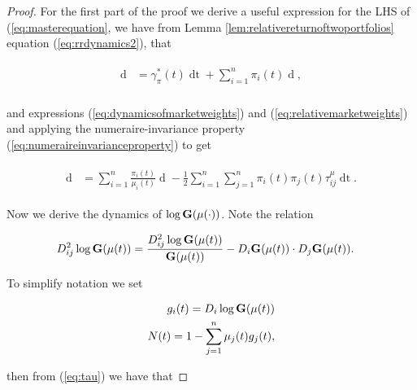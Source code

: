 \documentclass[british]{amsart} \usepackage{lmodern}
\numberwithin{equation}{section} \numberwithin{figure}{section}
\theoremstyle{plain} \newtheorem{thm}{\protect\theoremname}[section]
\theoremstyle{definition} \newtheorem{defn}[thm]{\protect\definitionname}
\theoremstyle{plain} \newtheorem{assumption}[thm]{\protect\assumptionname}
\theoremstyle{plain} \newtheorem{lem}[thm]{\protect\lemmaname}
\theoremstyle{plain} \newtheorem{prop}[thm]{\protect\propositionname}
\theoremstyle{remark} \newtheorem{rem}[thm]{\protect\remarkname}
\theoremstyle{plain} \newtheorem{cor}[thm]{\protect\corollaryname}
\renewcommand{\d}[1]{\mathop{\mathrm{d}{#1}}}
\begin{document}
\begin{proof}

For the first part of the proof we derive a useful expression for the LHS of
(\ref{eq:masterequation}, we have from Lemma
\ref{lem:relativereturnoftwoportfolios} equation (\ref{eq:rrdynamics2}), that

  \begin{gather} 
    \begin{split} 
      \d{ \log{ \left( \frac{V^{\pi}(t) }{ V^{\mu}(t) } \right) } } 
        &= \gamma_{\pi}^{*}(t)\d{t} + 
            \sum_{i=1}^{n} \pi_{i}(t)  \d{ \log{\mu_{i}(t)} }, \\ 
    \end{split} 
  \end{gather}

and expressions (\ref{eq:dynamicsofmarketweights}) and (\ref{eq:relativemarketweights})
and applying the numeraire-invariance property
(\ref{eq:numeraireinvarianceproperty}) to get
  
  \begin{gather} 
    \label{eq:masterstep1}
    \begin{split} 
      \d{ \log{ \left( \frac{V^{\pi}(t) }{ V^{\mu}(t) } \right) } } 
        &= 
            \sum_{i=1}^{n} \frac{\pi_{i}(t)}{\mu_{i}(t)} \d{\mu_{i}(t)} -
            \frac{1}{2}  \sum_{i=1}^{n} \sum_{j=1}^{n} 
            \pi_{i}(t)\pi_{j}(t)\tau_{ij}^{\mu}\d{t}.
    \end{split} 
  \end{gather}

Now we derive the dynamics of $\log{\mathbf{G}(\mu(\cdot))}$. Note the relation

  \begin{gather} 
    \begin{split} 
      D_{ij}^2\log{\mathbf{G}(\mu(t))} &= \frac{D_{ij}^2\log{\mathbf{G}(\mu(t))}}{\mathbf{G}(\mu(t))} - D_{i}\mathbf{G}(\mu(t)) \cdot D_{j}\mathbf{G}(\mu(t)).
    \end{split} 
  \end{gather}

To simplify notation we set

  \begin{gather} 
    \begin{split} 
        g_{i}(t) = D_{i}\log{\mathbf{G}(\mu(t))} \\
        N(t) = 1 - \sum_{j=1}^{n} \mu_{j}(t)g_{j}(t),
    \end{split} 
  \end{gather}

then from (\ref{eq:tau}) we have that
 

\end{proof}
\end{document}
